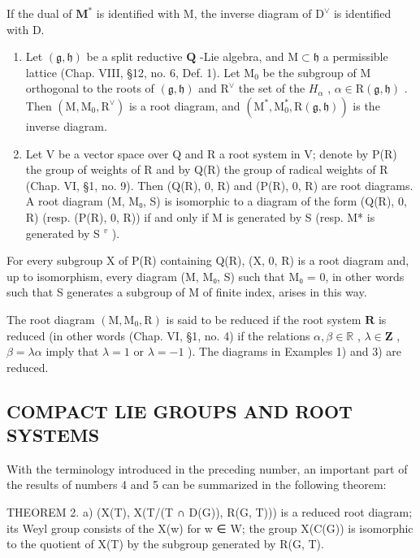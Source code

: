If the dual of \(\mathbf{M}^*\) is identified with M, the inverse diagram of \(\mathrm{D}^{\vee}\) is identified with D.

\begin{enumerate}
\def\labelenumi{\arabic{enumi})}
\setcounter{enumi}{2}
\item
  Let \((\mathfrak{g},\mathfrak{h})\) be a split reductive \(\mathbf{Q}\) -Lie algebra, and \(\mathrm{M} \subset \mathfrak{h}\) a permissible lattice (Chap. VIII, §12, no. 6, Def. 1). Let \(\mathrm{M}_0\) be the subgroup of M orthogonal to the roots of \((\mathfrak{g},\mathfrak{h})\) and \(\mathrm{R}^\vee\) the set of the \(H_{\alpha}\) , \(\alpha \in \mathrm{R}(\mathfrak{g},\mathfrak{h})\) . Then \((\mathrm{M},\mathrm{M}_0,\mathrm{R}^\vee)\) is a root diagram, and \((\mathrm{M}^*,\mathrm{M}_0^*,\mathrm{R}(\mathfrak{g},\mathfrak{h}))\) is the inverse diagram.
\item
  Let V be a vector space over Q and R a root system in V; denote by P(R) the group of weights of R and by Q(R) the group of radical weights of R (Chap. VI, §1, no. 9). Then (Q(R), 0, R) and (P(R), 0, R) are root diagrams. A root diagram (M, M₀, S) is isomorphic to a diagram of the form (Q(R), 0, R) (resp. (P(R), 0, R)) if and only if M is generated by S (resp. M* is generated by S \(^{v}\) ).
\end{enumerate}

For every subgroup X of P(R) containing Q(R), (X, 0, R) is a root diagram and, up to isomorphism, every diagram (M, M₀, S) such that M₀ = 0, in other words such that S generates a subgroup of M of finite index, arises in this way.

The root diagram \((\mathrm{M},\mathrm{M}_0,\mathrm{R})\) is said to be reduced if the root system \(\mathbf{R}\) is reduced (in other words (Chap. VI, §1, no. 4) if the relations \(\alpha ,\beta \in \mathbb{R}\) , \(\lambda \in \mathbf{Z}\) , \(\beta = \lambda \alpha\) imply that \(\lambda = 1\) or \(\lambda = -1\) ). The diagrams in Examples 1) and 3) are reduced.

\subsection{COMPACT LIE GROUPS AND ROOT SYSTEMS}

With the terminology introduced in the preceding number, an important part of the results of numbers 4 and 5 can be summarized in the following theorem:

THEOREM 2. a) (X(T), X(T/(T ∩ D(G)), R(G, T))) is a reduced root diagram; its Weyl group consists of the X(w) for w ∈ W; the group X(C(G)) is isomorphic to the quotient of X(T) by the subgroup generated by R(G, T).

